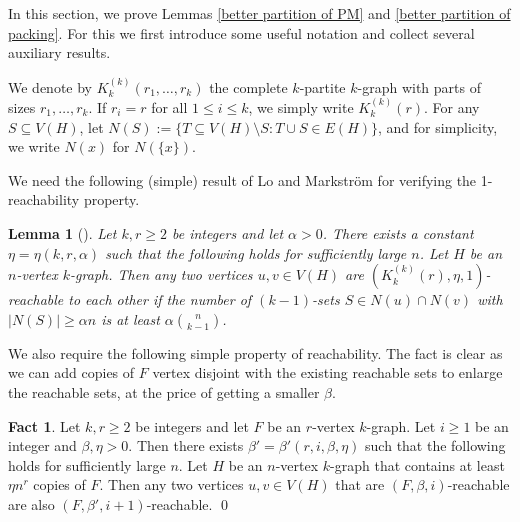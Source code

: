 \documentclass[11pt, letterpaper]{amsart}
\theoremstyle{plain}
\numberwithin{equation}{section}
\newtheorem{lemma}[thm]{Lemma}
\theoremstyle{definition}
\newtheorem{fact}[thm]{Fact}
\newcommand\card[1]{\left| #1 \right|}
\begin{document}
    In this section, we prove Lemmas \ref{better partition of PM} and \ref{better partition of packing}. 
    For this we first introduce some useful notation and collect several auxiliary results.

    We denote by \(K_k^{(k)}(r_1,\dots,r_k)\) the complete \(k\)-partite \(k\)-graph with parts of sizes \(r_1, \ldots, r_k\). If \(r_i=r\) for all \(1\le i\le k\), we simply write \(K_k^{(k)}(r)\). 
    For any \(S\subseteq V(H)\), let \(N(S):=\{T\subseteq V(H)\setminus S:T\cup S\in E(H)\}\), and for simplicity, we write \(N(x)\) for \(N(\{x\})\).

We need the following (simple) result of Lo and Markstr\"om for verifying the 1-reachability property.
    
    \begin{lemma}[\cite{lo2015f}]\label{alpha good}
    Let $k,r\ge 2$ be integers and let $\alpha>0$. There exists a constant $\eta=\eta(k,r,\alpha)$ such that the following holds for sufficiently large $n$. 
    Let \(H\) be an \(n\)-vertex \(k\)-graph. 
    Then any two vertices \(u,v\in V(H)\) are $(K_k^{(k)}(r),\eta,1)$-reachable to each other if the number of \((k-1)\)-sets \(S\in N(u)\cap N(v)\) with \(\card{N(S)}\ge \alpha n\) is at least \(\alpha \binom{n}{k-1}\).
    \end{lemma}

We also require the following simple property of reachability.
The fact is clear as we can add copies of $F$ vertex disjoint with the existing reachable sets to enlarge the reachable sets, at the price of getting a smaller $\beta$.

    \begin{fact}\label{fact:i-reachable}
         Let $k,r\ge 2$ be integers and let \(F\) be an \(r\)-vertex \(k\)-graph. Let \(i\ge 1\) be an integer and \(\beta,\eta>0\). Then there exists \(\beta'=\beta'(r,i,\beta,\eta)\) such that the following holds for sufficiently large \(n\). 
         Let \(H\) be an \(n\)-vertex \(k\)-graph that contains at least \(\eta n^r\) copies of \(F\). Then any two vertices \(u,v\in V(H)\) that are \((F,\beta,i)\)-reachable are also \((F,\beta',i+1)\)-reachable. \qed
    \end{fact}
\end{document}
